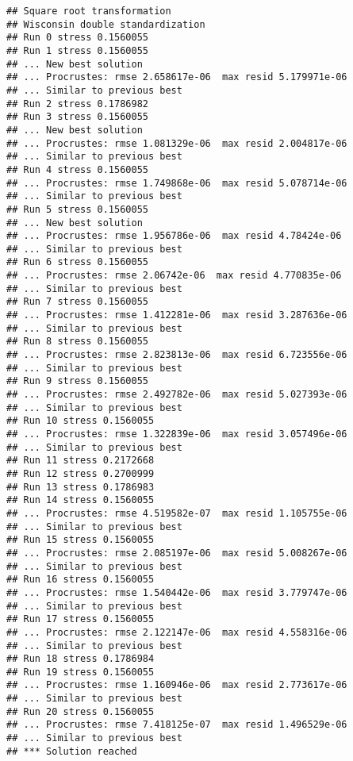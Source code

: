 \documentclass[
]{article}
\newenvironment{Shaded}{\begin{snugshade}}{\end{snugshade}}
\newcommand{\CommentTok}[1]{\textcolor[rgb]{0.56,0.35,0.01}{\textit{#1}}}
\newcommand{\NormalTok}[1]{#1}
\newcommand{\SpecialCharTok}[1]{\textcolor[rgb]{0.00,0.00,0.00}{#1}}
\begin{document}
\begin{verbatim}
## Square root transformation
## Wisconsin double standardization
## Run 0 stress 0.1560055 
## Run 1 stress 0.1560055 
## ... New best solution
## ... Procrustes: rmse 2.658617e-06  max resid 5.179971e-06 
## ... Similar to previous best
## Run 2 stress 0.1786982 
## Run 3 stress 0.1560055 
## ... New best solution
## ... Procrustes: rmse 1.081329e-06  max resid 2.004817e-06 
## ... Similar to previous best
## Run 4 stress 0.1560055 
## ... Procrustes: rmse 1.749868e-06  max resid 5.078714e-06 
## ... Similar to previous best
## Run 5 stress 0.1560055 
## ... New best solution
## ... Procrustes: rmse 1.956786e-06  max resid 4.78424e-06 
## ... Similar to previous best
## Run 6 stress 0.1560055 
## ... Procrustes: rmse 2.06742e-06  max resid 4.770835e-06 
## ... Similar to previous best
## Run 7 stress 0.1560055 
## ... Procrustes: rmse 1.412281e-06  max resid 3.287636e-06 
## ... Similar to previous best
## Run 8 stress 0.1560055 
## ... Procrustes: rmse 2.823813e-06  max resid 6.723556e-06 
## ... Similar to previous best
## Run 9 stress 0.1560055 
## ... Procrustes: rmse 2.492782e-06  max resid 5.027393e-06 
## ... Similar to previous best
## Run 10 stress 0.1560055 
## ... Procrustes: rmse 1.322839e-06  max resid 3.057496e-06 
## ... Similar to previous best
## Run 11 stress 0.2172668 
## Run 12 stress 0.2700999 
## Run 13 stress 0.1786983 
## Run 14 stress 0.1560055 
## ... Procrustes: rmse 4.519582e-07  max resid 1.105755e-06 
## ... Similar to previous best
## Run 15 stress 0.1560055 
## ... Procrustes: rmse 2.085197e-06  max resid 5.008267e-06 
## ... Similar to previous best
## Run 16 stress 0.1560055 
## ... Procrustes: rmse 1.540442e-06  max resid 3.779747e-06 
## ... Similar to previous best
## Run 17 stress 0.1560055 
## ... Procrustes: rmse 2.122147e-06  max resid 4.558316e-06 
## ... Similar to previous best
## Run 18 stress 0.1786984 
## Run 19 stress 0.1560055 
## ... Procrustes: rmse 1.160946e-06  max resid 2.773617e-06 
## ... Similar to previous best
## Run 20 stress 0.1560055 
## ... Procrustes: rmse 7.418125e-07  max resid 1.496529e-06 
## ... Similar to previous best
## *** Solution reached
\end{verbatim}

\begin{Shaded}
\end{Shaded}
\end{document}
